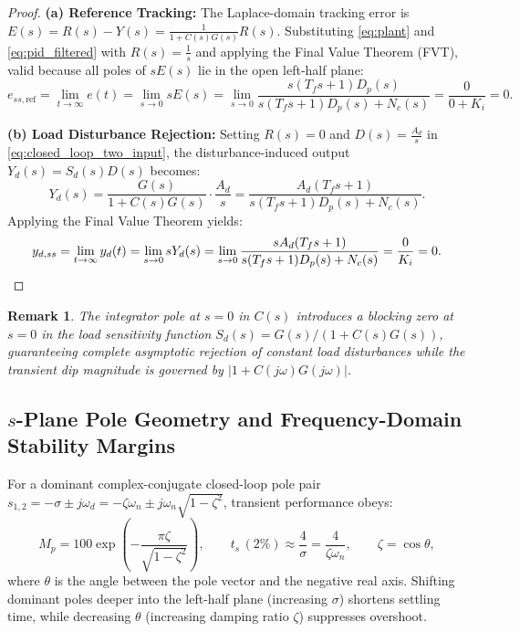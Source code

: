 \documentclass[11pt,a4paper]{article}
\newtheorem{remark}{Remark}
\begin{document}
\begin{proof}
\textbf{(a) Reference Tracking:} The Laplace-domain tracking error is $E(s) = R(s) - Y(s) = \frac{1}{1 + C(s)G(s)}R(s)$. Substituting \eqref{eq:plant} and \eqref{eq:pid_filtered} with $R(s) = \frac{1}{s}$ and applying the Final Value Theorem (FVT), valid because all poles of $sE(s)$ lie in the open left-half plane:
\[
  e_{ss,\text{ref}} = \lim_{t \to \infty} e(t) = \lim_{s \to 0} s E(s) = \lim_{s \to 0} \frac{s(T_f s + 1)D_p(s)}{s(T_f s + 1)D_p(s) + N_c(s)} = \frac{0}{0 + K_i} = 0.
\]

\textbf{(b) Load Disturbance Rejection:} Setting $R(s) = 0$ and $D(s) = \frac{A_d}{s}$ in \eqref{eq:closed_loop_two_input}, the disturbance-induced output $Y_d(s) = S_d(s)D(s)$ becomes:
\[
  Y_d(s) = \frac{G(s)}{1 + C(s)G(s)} \cdot \frac{A_d}{s} = \frac{A_d(T_f s + 1)}{s(T_f s + 1)D_p(s) + N_c(s)}.
\]
Applying the Final Value Theorem yields:
\[
  y_{d,ss} = \lim_{t \to \infty} y_d(t) = \lim_{s \to 0} s Y_d(s) = \lim_{s \to 0} \frac{s A_d(T_f s + 1)}{s(T_f s + 1)D_p(s) + N_c(s)} = \frac{0}{K_i} = 0. \qedhere
\]
\end{proof}

\begin{remark}
The integrator pole at $s = 0$ in $C(s)$ introduces a blocking zero at $s = 0$ in the load sensitivity function $S_d(s) = G(s)/(1 + C(s)G(s))$, guaranteeing complete asymptotic rejection of constant load disturbances while the transient dip magnitude is governed by $|1 + C(j\omega)G(j\omega)|$.
\end{remark}

\subsection{\texorpdfstring{$s$}{s}-Plane Pole Geometry and Frequency-Domain Stability Margins}
For a dominant complex-conjugate closed-loop pole pair $s_{1,2} = -\sigma \pm j\omega_d = -\zeta\omega_n \pm j\omega_n\sqrt{1 - \zeta^2}$, transient performance obeys:
\begin{equation}
  M_p = 100\exp\!\left(-\frac{\pi\zeta}{\sqrt{1 - \zeta^2}}\right), \qquad t_s\,(2\%) \approx \frac{4}{\sigma} = \frac{4}{\zeta\omega_n}, \qquad \zeta = \cos\theta,
\end{equation}
where $\theta$ is the angle between the pole vector and the negative real axis. Shifting dominant poles deeper into the left-half plane (increasing $\sigma$) shortens settling time, while decreasing $\theta$ (increasing damping ratio $\zeta$) suppresses overshoot.
\end{document}
